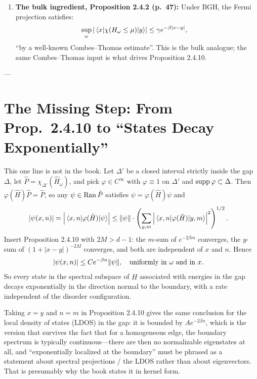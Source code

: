 \begin{enumerate}
    The book gives no proof, only the remark that ``these estimates are by now standard with proofs based on the functional calculus introduced by Dynkin [57], often also referred to as the Helffer--Sjöstrand formula [89]'', citing Elbau--Graf [58], Schulz-Baldes [194], and Prodan [166].

    \item \textbf{The bulk ingredient, Proposition 2.4.2 (p.~47):} 
    Under BGH, the Fermi projection satisfies:
    \[
        \sup_{\omega} \abs{\matrixel{x}{\chi(H_\omega \le \mu)}{y}} \le \gamma e^{-\beta|x-y|},
    \]
    ``by a well-known Combes--Thomas estimate''. This is the bulk analogue; the same Combes--Thomas input is what drives Proposition 2.4.10.
\end{enumerate}

---

\section{The Missing Step: From Prop.~2.4.10 to ``States Decay Exponentially''}

This one line is not in the book. Let $\Delta'$ be a closed interval strictly inside the gap $\Delta$, let $\hat{P} = \chi_{\Delta'}(\hat{H}_\omega)$, and pick $\varphi \in C^\infty$ with $\varphi \equiv 1$ on $\Delta'$ and $\operatorname{supp} \varphi \subset \Delta$. Then $\varphi(\hat{H})\hat{P} = \hat{P}$, so any $\psi \in \operatorname{Ran} \hat{P}$ satisfies $\psi = \varphi(\hat{H})\psi$ and
\[
    |\psi(x,n)| = \abs{\matrixel{x,n}{\varphi(\hat{H})}{\psi}} \le \norm{\psi} \cdot \left( \sum_{y,m} \abs{\matrixel{x,n}{\varphi(\hat{H})}{y,m}}^2 \right)^{1/2}.
\]
Insert Proposition 2.4.10 with $2M > d-1$: the $m$-sum of $e^{-2\beta m}$ converges, the $y$-sum of $(1+|x-y|)^{-2M}$ converges, and both are independent of $x$ and $n$. Hence
\[
    |\psi(x,n)| \le C e^{-\beta n} \norm{\psi}, \quad \text{uniformly in } \omega \text{ and in } x.
\]
So every state in the spectral subspace of $\hat{H}$ associated with energies in the gap decays exponentially in the direction normal to the boundary, with a rate independent of the disorder configuration. 

Taking $x = y$ and $n = m$ in Proposition 2.4.10 gives the same conclusion for the local density of states (LDOS) in the gap: it is bounded by $A e^{-2\beta n}$, which is the version that survives the fact that for a homogeneous edge, the boundary spectrum is typically continuous---there are then no normalizable eigenstates at all, and ``exponentially localized at the boundary'' must be phrased as a statement about spectral projections / the LDOS rather than about eigenvectors. That is presumably why the book states it in kernel form.


